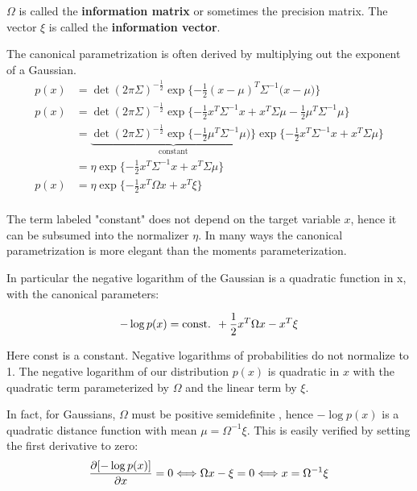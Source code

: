 \documentclass[14pt,letterpaper]{article}
\theoremstyle{definition}
\begin{document}
$\Omega$ is called the \textbf{information matrix} or sometimes the precision matrix.
The vector $\xi$ is called the \textbf{information vector}.

The canonical parametrization is often derived by multiplying out the exponent of a Gaussian.
\begin{align}
  p(x) &= \det{(2\pi\Sigma)^{-\frac{1}{2}}} \exp{\{-\frac{1}{2}(x-\mu)^{T}\Sigma^{-1}(x-\mu})\} \\
  p(x) &= \det{(2\pi\Sigma)^{-\frac{1}{2}}} \exp{\{-\frac{1}{2} x^T\Sigma^{-1}x + x^T\Sigma\mu -\frac{1}{2} \mu^T\Sigma^{-1}\mu}\} \\
           &= \underbrace{\det{(2\pi\Sigma)^{-\frac{1}{2}}} \exp{\{-\frac{1}{2} \mu^T\Sigma^{-1}\mu})\}}_{\text{constant}} \exp{\{-\frac{1}{2} x^T\Sigma^{-1}x + x^T\Sigma\mu}\} \\
           &= \eta \exp{\{-\frac{1}{2} x^T\Sigma^{-1}x + x^T\Sigma\mu}\} \\
        p(x)   &= \eta \exp{\{-\frac{1}{2} x^T\Omega x + x^T\xi}\} \\
\end{align}

The term labeled "constant" does not depend on the target variable $x$, hence it can be subsumed into the normalizer $\eta$.
In many ways the canonical parametrization is more elegant than the moments parameterization.

In particular the negative logarithm of the Gaussian is a quadratic function in x, with the canonical parameters:

\begin{equation}
  -\log{p(x)} = \text{const. } + \frac{1}{2} x^T \Omega x - x^T \xi \\
  \label{eq:Negative logarithm of gaussian in canonical parametrization}
\end{equation}

Here const is a constant. Negative logarithms of probabilities do not normalize to 1.
The negative logarithm of our distribution $p(x)$ is quadratic in $x$ with the quadratic term parameterized by $\Omega$ and the linear term by $\xi$.

In fact, for Gaussians, $\Omega$ must be positive semidefinite , hence $-\log{p(x)}$ is a quadratic distance function with mean $\mu=\Omega^{-1}\xi$.
This is easily verified by setting the first derivative to zero:
\begin{equation}
  \frac{\partial{ [-\log{p(x)}] }}{\partial{x}} = 0 \Longleftrightarrow \Omega x - \xi = 0 \Longleftrightarrow x = \Omega^{-1}\xi\\
  \label{eq:First derivative of negative log og Gaussian in canonical form}
\end{equation}
\end{document}
